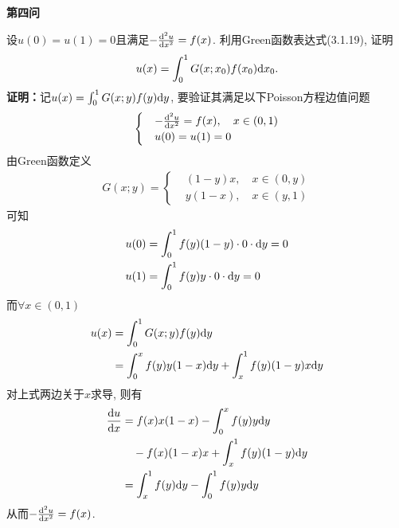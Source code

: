\documentclass[12pt]{article}
\begin{document}
\begin{center}
	\textbf{第四问}
\end{center}
\noindent 设$u(0)=u(1)=0$且满足$-\frac{{\rm d}^2u}{{\rm d}x^2}=f(x)$. 利用Green函数表达式(3.1.19), 证明$$u(x)=\int_{0}^{1}G(x;x_0)f(x_0){\rm d}x_0.$$
\noindent \textbf{证明：}记$u(x)=\int_{0}^{1}G(x;y)f(y){\rm d}y$, 要验证其满足以下Poisson方程边值问题
\begin{align*}
	\begin{cases}
		&-\frac{{\rm d}^2u}{{\rm d}x^2}=f(x),\quad  x\in(0,1)\\
		&u(0)=u(1)=0
	\end{cases}
\end{align*}
\noindent 由Green函数定义
\begin{align*}
	G(x;y)=\begin{cases}
		&(1-y)x,\quad x\in(0,y)\\
		&y(1-x),\quad x\in(y,1)
	\end{cases}
\end{align*}
\noindent 可知
\begin{align*}
	u(0)&=\int_{0}^{1}f(y)(1-y)\cdot0\cdot{\rm d}y=0\\
	u(1)&=\int_{0}^{1}f(y)y\cdot0\cdot{\rm d}y=0
\end{align*}
\noindent 而$\forall x\in(0,1)$
\begin{align*}
	u(x)&=\int_{0}^{1}G(x;y)f(y){\rm d}y\\
	&=\int_{0}^{x}f(y)y(1-x){\rm d}y+\int_{x}^{1}f(y)(1-y)x{\rm d}y
\end{align*}
\noindent 对上式两边关于$x$求导, 则有
\begin{align*}
	\frac{{\rm d}u}{{\rm d}x}&=f(x)x(1-x)-\int_{0}^{x}f(y)y{\rm d}y\\
	&\quad -f(x)(1-x)x+\int_{x}^{1}f(y)(1-y){\rm d}y\\
	&=\int_{x}^{1}f(y){\rm d}y-\int_{0}^{1}f(y)y{\rm d}y
\end{align*}
\noindent 从而$-\frac{{\rm d}^2u}{{\rm d}x^2}=f(x)$.
	
	
	
	
	
\end{document}
